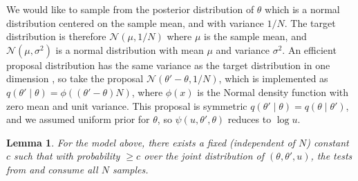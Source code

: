 \documentclass{article}
\newtheorem{lemma}{Lemma}
\begin{document}
We would like to sample from the posterior distribution of $\theta$
which is a normal distribution centered on the sample mean, and with
variance $1/N$.  The target distribution is therefore
$\mathcal{N}(\mu,1/N)$ where $\mu$ is the sample mean, and $\mathcal{N}(\mu,\sigma^2)$ is a
normal distribution with mean $\mu$ and variance $\sigma^2$.  An efficient
proposal distribution has the same variance as the target distribution in one dimension
\cite{OptimalScaling01}, so take the proposal
$\mathcal{N}(\theta'-\theta,1/N)$, which is implemented as $q(\theta'\mid\theta) =
\phi((\theta'-\theta)N)$, where $\phi(x)$ is the Normal density
function with zero mean and unit variance. This proposal is symmetric
$q(\theta'\mid\theta)=q(\theta\mid\theta')$, and we assumed uniform
prior for $\theta$, so $\psi(u,\theta',\theta)$ reduces to $\log
u$.

\begin{lemma}\label{lem:efficienty_cutting}
  For the model above, there
  exists a fixed (independent of $N$) constant $c$ such that with probability $ \geq c$ over the joint
  distribution of $(\theta, \theta', u)$, the
  tests from \cite{icml2014c1_bardenet14} and \cite{cutting_mh_2014} consume all $N$ samples. 
\end{lemma}
\end{document}
